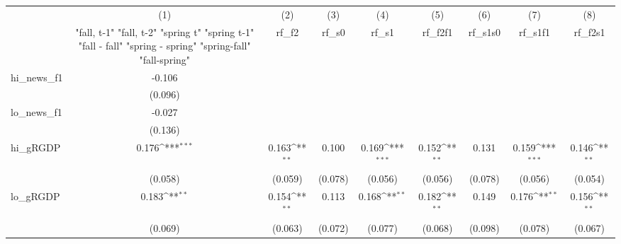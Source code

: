 {
\def\sym#1{\ifmmode^{#1}\else\(^{#1}\)\fi}
\begin{tabular}{l*{8}{c}}
\toprule
            &\multicolumn{1}{c}{(1)}&\multicolumn{1}{c}{(2)}&\multicolumn{1}{c}{(3)}&\multicolumn{1}{c}{(4)}&\multicolumn{1}{c}{(5)}&\multicolumn{1}{c}{(6)}&\multicolumn{1}{c}{(7)}&\multicolumn{1}{c}{(8)}\\
            &\multicolumn{1}{c}{  "fall, t-1" "fall, t-2" "spring t" "spring t-1"  "fall - fall" "spring - spring" "spring-fall" "fall-spring" }&\multicolumn{1}{c}{rf\_f2}&\multicolumn{1}{c}{rf\_s0}&\multicolumn{1}{c}{rf\_s1}&\multicolumn{1}{c}{rf\_f2f1}&\multicolumn{1}{c}{rf\_s1s0}&\multicolumn{1}{c}{rf\_s1f1}&\multicolumn{1}{c}{rf\_f2s1}\\
\midrule
hi\_news\_f1  &      -0.106         &                     &                     &                     &                     &                     &                     &                     \\
            &     (0.096)         &                     &                     &                     &                     &                     &                     &                     \\
\addlinespace
lo\_news\_f1  &      -0.027         &                     &                     &                     &                     &                     &                     &                     \\
            &     (0.136)         &                     &                     &                     &                     &                     &                     &                     \\
\addlinespace
hi\_gRGDP    &       0.176\sym{***}&       0.163\sym{**} &       0.100         &       0.169\sym{***}&       0.152\sym{**} &       0.131         &       0.159\sym{***}&       0.146\sym{**} \\
            &     (0.058)         &     (0.059)         &     (0.078)         &     (0.056)         &     (0.056)         &     (0.078)         &     (0.056)         &     (0.054)         \\
\addlinespace
lo\_gRGDP    &       0.183\sym{**} &       0.154\sym{**} &       0.113         &       0.168\sym{**} &       0.182\sym{**} &       0.149         &       0.176\sym{**} &       0.156\sym{**} \\
            &     (0.069)         &     (0.063)         &     (0.072)         &     (0.077)         &     (0.068)         &     (0.098)         &     (0.078)         &     (0.067)         \\

\end{tabular}}
